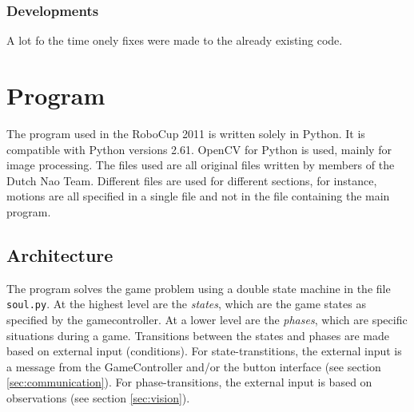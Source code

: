 \documentclass[11pt,a4paper,oneside]{article}
\begin{document}
\subsubsection{Developments}
A lot fo the time onely fixes were made to the already existing code.

\section{Program}
The program used in the RoboCup 2011 is written solely in Python. It is compatible with Python versions 2.61. OpenCV for Python is used, mainly for image processing. The files used are all original files written by members of the Dutch Nao Team. Different files are used for different sections, for instance, motions are all specified in a single file and not in the file containing the main program.
\subsection{Architecture}
\label{sec:architecture}
The program solves the game problem using a double state machine in the file \texttt{soul.py}. At the highest level are the \textit{states}, which are the game states as specified by the gamecontroller. 
At a lower level are the \textit{phases}, which are specific situations during a game. Transitions between the states and phases are made based on external input (conditions). 
For state-transtitions, the external input is a message from the GameController and/or the button interface (see section \ref{sec:communication}). 
For phase-transitions, the external input is based on observations (see section \ref{sec:vision}). 

\end{document}
